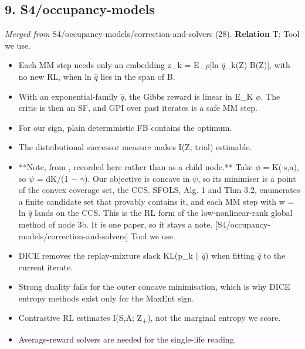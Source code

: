 \documentclass[10pt]{article}
\begin{document}
\subsection{9. S4/occupancy-models}\label{node:S4-S4-occupancy-models}
\textit{Merged from} S4/occupancy-models/correction-and-solvers (28). \textbf{Relation} \textsf{T}: Tool we use.
\begin{itemize}[nosep,leftmargin=1.2em]
\item Each MM step needs only an embedding z\_k = E\_\ensuremath{\rho}[ln \ensuremath{\hat{q}}\_k(Z) B(Z)], with no new RL, when ln \ensuremath{\hat{q}} lies in the span of B.
\item With an exponential-family \ensuremath{\hat{q}}, the Gibbs reward is linear in E\_K \ensuremath{\phi}. The critic is then an SF, and GPI over past iterates is a safe MM step.
\item For our sign, plain deterministic FB contains the optimum.
\item The distributional successor measure \citep{Wiltzer-distributional24} makes I(Z; trial) estimable.
\item **Note, from \citet{Alegre-optimistic22}, recorded here rather than as a child node.** Take \ensuremath{\phi} = K(\ensuremath{\cdot}\textbar{}s,a), so \ensuremath{\psi} = dK/(1 \ensuremath{-} \ensuremath{\gamma}). Our objective is concave in \ensuremath{\psi}, so its minimiser is a point of the convex coverage set, the CCS. SFOLS, Alg. 1 and Thm 3.2, enumerates a finite candidate set that provably contains it, and each MM step with w = ln \ensuremath{\hat{q}} lands on the CCS. This is the RL form of the low-nonlinear-rank global method of node 3b. It is one paper, so it stays a note. [S4/occupancy-models/correction-and-solvers] Tool we use.
\item DICE removes the replay-mixture slack KL(p\_k\ensuremath{\|}\ensuremath{\hat{q}}) when fitting \ensuremath{\hat{q}} to the current iterate.
\item Strong duality fails for the outer concave minimisation, which is why DICE entropy methods exist only for the MaxEnt sign.
\item Contrastive RL estimates I(S,A; Z\textsubscript{+}), not the marginal entropy we score.
\item Average-reward solvers are needed for the single-life reading.
\end{itemize}
\end{document}
